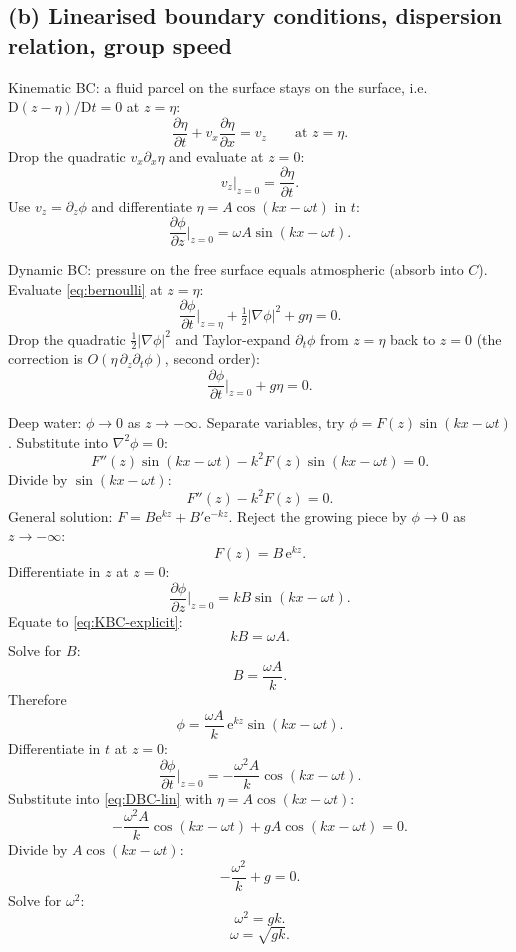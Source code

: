 \documentclass[11pt]{article}
\newcommand{\D}{\mathrm{D}}
\newcommand{\pd}[2]{\frac{\partial #1}{\partial #2}}
\newcommand{\Lap}{\nabla^{2}}
\begin{document}
\subsection*{(b) Linearised boundary conditions, dispersion relation, group speed}

Kinematic BC: a fluid parcel on the surface stays on the surface, i.e.\ $\D(z-\eta)/\D t = 0$ at $z=\eta$:
\begin{equation}
\pd{\eta}{t} + v_x\pd{\eta}{x} = v_z \qquad \text{at }z=\eta.
\label{eq:KBC-exact}
\end{equation}
Drop the quadratic $v_x\partial_x\eta$ and evaluate at $z=0$:
\begin{equation}
v_z\big|_{z=0} = \pd{\eta}{t}.
\label{eq:KBC-lin}
\end{equation}
Use $v_z=\partial_z\phi$ and differentiate $\eta=A\cos(kx-\omega t)$ in $t$:
\begin{equation}
\pd{\phi}{z}\bigg|_{z=0} = \omega A\sin(kx-\omega t).
\label{eq:KBC-explicit}
\end{equation}

Dynamic BC: pressure on the free surface equals atmospheric (absorb into $C$). Evaluate \eqref{eq:bernoulli} at $z=\eta$:
\[ \pd{\phi}{t}\bigg|_{z=\eta} + \tfrac12|\nabla\phi|^2 + g\eta = 0. \]
Drop the quadratic $\tfrac12|\nabla\phi|^2$ and Taylor-expand $\partial_t\phi$ from $z=\eta$ back to $z=0$ (the correction is $O(\eta\,\partial_z\partial_t\phi)$, second order):
\begin{equation}
\pd{\phi}{t}\bigg|_{z=0} + g\eta = 0.
\label{eq:DBC-lin}
\end{equation}

Deep water: $\phi\to 0$ as $z\to-\infty$. Separate variables, try $\phi = F(z)\sin(kx-\omega t)$. Substitute into $\Lap\phi=0$:
\[ F''(z)\sin(kx-\omega t) - k^2 F(z)\sin(kx-\omega t) = 0. \]
Divide by $\sin(kx-\omega t)$:
\[ F''(z) - k^2 F(z) = 0. \]
General solution: $F=B\mathrm{e}^{kz}+B'\mathrm{e}^{-kz}$. Reject the growing piece by $\phi\to 0$ as $z\to -\infty$:
\[ F(z) = B\,\mathrm{e}^{kz}. \]
Differentiate in $z$ at $z=0$:
\[ \pd{\phi}{z}\bigg|_{z=0} = kB\sin(kx-\omega t). \]
Equate to \eqref{eq:KBC-explicit}:
\[ kB = \omega A. \]
Solve for $B$:
\[ B = \frac{\omega A}{k}. \]
Therefore
\begin{equation}
\phi = \frac{\omega A}{k}\,\mathrm{e}^{kz}\sin(kx-\omega t).
\label{eq:phi-soln}
\end{equation}
Differentiate in $t$ at $z=0$:
\[ \pd{\phi}{t}\bigg|_{z=0} = -\frac{\omega^2 A}{k}\cos(kx-\omega t). \]
Substitute into \eqref{eq:DBC-lin} with $\eta=A\cos(kx-\omega t)$:
\[ -\frac{\omega^2 A}{k}\cos(kx-\omega t) + gA\cos(kx-\omega t) = 0. \]
Divide by $A\cos(kx-\omega t)$:
\[ -\frac{\omega^2}{k} + g = 0. \]
Solve for $\omega^2$:
\[ \omega^2 = gk. \]
\begin{equation}
\boxed{\;\omega = \sqrt{gk}.\;}
\label{eq:disp}
\end{equation}
\end{document}
